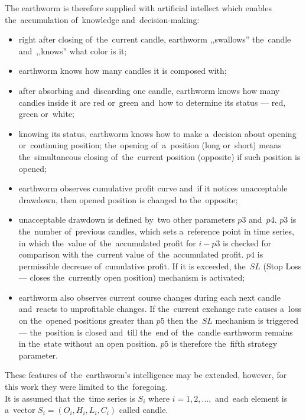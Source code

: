 \documentclass[runningheads,a4paper]{llncs}
\begin{document}
The earthworm is therefore supplied with artificial intellect which enables the~accumulation of~knowledge and~decision-making:
\begin{itemize}
\item right after closing of~the~current candle, earthworm ,,swallows'' the~candle and~,,knows'' what color is it;
\item earthworm knows how many candles it is composed with;
\item after absorbing and~discarding one candle, earthworm knows how many candles inside it are red or~green and~how to determine its status --- red, green or~white;
\item knowing its status, earthworm knows how to make a~decision about opening or~continuing position; the~opening of~a~position (long or~short) means the~simultaneous closing of~the~current position (opposite) if such position is opened;
\item earthworm observes cumulative profit curve and~if it  notices unacceptable drawdown, then opened position is changed to the~opposite;
\item unacceptable drawdown is defined by~two other parameters $p3$ and~$p4$. $p3$ is the~number of~previous candles, which sets a~reference point in time series, in which the~value of~the~accumulated profit for $i-p3$ is checked for comparison with the~current value of~the~accumulated profit. $p4$ is permissible decrease of~cumulative profit. If it is exceeded, the~$SL$ (Stop Loss --- closes the~currently open position) mechanism is activated;
\item earthworm also observes current course changes during  each next candle and~reacts to unprofitable changes. If the~current exchange rate causes a~loss on the~opened positions greater than $p5$ then the~$SL$ mechanism is triggered --- the~position is closed and~till the~end of~the~candle earthworm remains in the~state without an open position. $p5$ is therefore the~fifth strategy parameter. 
\end{itemize}

These features of~the~earthworm's intelligence may be extended, however, for this work they were limited to the~foregoing. \\

It is assumed that the~time series is $S_i$ where $i = 1, 2, ...,$ and~each element is a~vector $S_i = (O_i, H_i, L_i, C_i)$ called candle.\\
\end{document}
